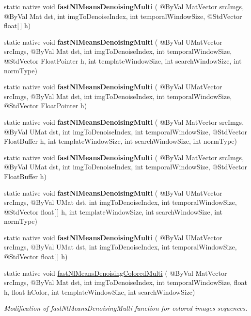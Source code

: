 \begin{DoxyCompactItemize}
\item 
static native void {\bfseries fast\+Nl\+Means\+Denoising\+Multi} ( @By\+Val Mat\+Vector src\+Imgs, @By\+Val Mat dst, int img\+To\+Denoise\+Index, int temporal\+Window\+Size, @Std\+Vector float\mbox{[}$\,$\mbox{]} h)
\item 
static native void {\bfseries fast\+Nl\+Means\+Denoising\+Multi} ( @By\+Val U\+Mat\+Vector src\+Imgs, @By\+Val Mat dst, int img\+To\+Denoise\+Index, int temporal\+Window\+Size, @Std\+Vector Float\+Pointer h, int template\+Window\+Size, int search\+Window\+Size, int norm\+Type)
\item 
static native void {\bfseries fast\+Nl\+Means\+Denoising\+Multi} ( @By\+Val U\+Mat\+Vector src\+Imgs, @By\+Val Mat dst, int img\+To\+Denoise\+Index, int temporal\+Window\+Size, @Std\+Vector Float\+Pointer h)
\item 
static native void {\bfseries fast\+Nl\+Means\+Denoising\+Multi} ( @By\+Val Mat\+Vector src\+Imgs, @By\+Val U\+Mat dst, int img\+To\+Denoise\+Index, int temporal\+Window\+Size, @Std\+Vector Float\+Buffer h, int template\+Window\+Size, int search\+Window\+Size, int norm\+Type)
\item 
static native void {\bfseries fast\+Nl\+Means\+Denoising\+Multi} ( @By\+Val Mat\+Vector src\+Imgs, @By\+Val U\+Mat dst, int img\+To\+Denoise\+Index, int temporal\+Window\+Size, @Std\+Vector Float\+Buffer h)
\item 
static native void {\bfseries fast\+Nl\+Means\+Denoising\+Multi} ( @By\+Val U\+Mat\+Vector src\+Imgs, @By\+Val U\+Mat dst, int img\+To\+Denoise\+Index, int temporal\+Window\+Size, @Std\+Vector float\mbox{[}$\,$\mbox{]} h, int template\+Window\+Size, int search\+Window\+Size, int norm\+Type)
\item 
static native void {\bfseries fast\+Nl\+Means\+Denoising\+Multi} ( @By\+Val U\+Mat\+Vector src\+Imgs, @By\+Val U\+Mat dst, int img\+To\+Denoise\+Index, int temporal\+Window\+Size, @Std\+Vector float\mbox{[}$\,$\mbox{]} h)
\item 
static native void \hyperlink{group__photo__denoise_ga689c12cd97213b5dd69ed55e0971f4b5}{fast\+Nl\+Means\+Denoising\+Colored\+Multi} ( @By\+Val Mat\+Vector src\+Imgs, @By\+Val Mat dst, int img\+To\+Denoise\+Index, int temporal\+Window\+Size, float h, float h\+Color, int template\+Window\+Size, int search\+Window\+Size)
\begin{DoxyCompactList}\small\item\em Modification of fast\+Nl\+Means\+Denoising\+Multi function for colored images sequences. \end{DoxyCompactList}\item 

\end{DoxyCompactItemize}
